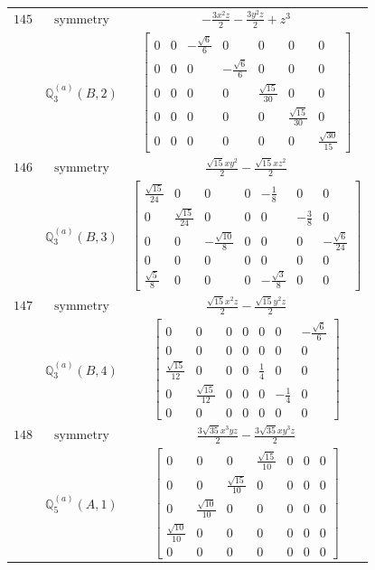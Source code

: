 \documentclass[fleqn,8pt,landscape]{jsarticle}
\begin{document}
\begin{longtable}{ccc}
$ 145 $ & $ \text{symmetry} $ & $ - \frac{3 x^{2} z}{2} - \frac{3 y^{2} z}{2} + z^{3} $ \\
$  $ & $ \mathbb{Q}_{3}^{(a)}(B,2) $ & $ \begin{bmatrix} 0 & 0 & - \frac{\sqrt{6}}{6} & 0 & 0 & 0 & 0 \\ 0 & 0 & 0 & - \frac{\sqrt{6}}{6} & 0 & 0 & 0 \\ 0 & 0 & 0 & 0 & \frac{\sqrt{15}}{30} & 0 & 0 \\ 0 & 0 & 0 & 0 & 0 & \frac{\sqrt{15}}{30} & 0 \\ 0 & 0 & 0 & 0 & 0 & 0 & \frac{\sqrt{30}}{15} \end{bmatrix} $ \\ \hline
$ 146 $ & $ \text{symmetry} $ & $ \frac{\sqrt{15} x y^{2}}{2} - \frac{\sqrt{15} x z^{2}}{2} $ \\
$  $ & $ \mathbb{Q}_{3}^{(a)}(B,3) $ & $ \begin{bmatrix} \frac{\sqrt{15}}{24} & 0 & 0 & 0 & - \frac{1}{8} & 0 & 0 \\ 0 & \frac{\sqrt{15}}{24} & 0 & 0 & 0 & - \frac{3}{8} & 0 \\ 0 & 0 & - \frac{\sqrt{10}}{8} & 0 & 0 & 0 & - \frac{\sqrt{6}}{24} \\ 0 & 0 & 0 & 0 & 0 & 0 & 0 \\ \frac{\sqrt{5}}{8} & 0 & 0 & 0 & - \frac{\sqrt{3}}{8} & 0 & 0 \end{bmatrix} $ \\ \hline
$ 147 $ & $ \text{symmetry} $ & $ \frac{\sqrt{15} x^{2} z}{2} - \frac{\sqrt{15} y^{2} z}{2} $ \\
$  $ & $ \mathbb{Q}_{3}^{(a)}(B,4) $ & $ \begin{bmatrix} 0 & 0 & 0 & 0 & 0 & 0 & - \frac{\sqrt{6}}{6} \\ 0 & 0 & 0 & 0 & 0 & 0 & 0 \\ \frac{\sqrt{15}}{12} & 0 & 0 & 0 & \frac{1}{4} & 0 & 0 \\ 0 & \frac{\sqrt{15}}{12} & 0 & 0 & 0 & - \frac{1}{4} & 0 \\ 0 & 0 & 0 & 0 & 0 & 0 & 0 \end{bmatrix} $ \\ \hline
$ 148 $ & $ \text{symmetry} $ & $ \frac{3 \sqrt{35} x^{3} y z}{2} - \frac{3 \sqrt{35} x y^{3} z}{2} $ \\
$  $ & $ \mathbb{Q}_{5}^{(a)}(A,1) $ & $ \begin{bmatrix} 0 & 0 & 0 & \frac{\sqrt{15}}{10} & 0 & 0 & 0 \\ 0 & 0 & \frac{\sqrt{15}}{10} & 0 & 0 & 0 & 0 \\ 0 & \frac{\sqrt{10}}{10} & 0 & 0 & 0 & 0 & 0 \\ \frac{\sqrt{10}}{10} & 0 & 0 & 0 & 0 & 0 & 0 \\ 0 & 0 & 0 & 0 & 0 & 0 & 0 \end{bmatrix} $ \\ \hline

\end{longtable}
\end{document}
